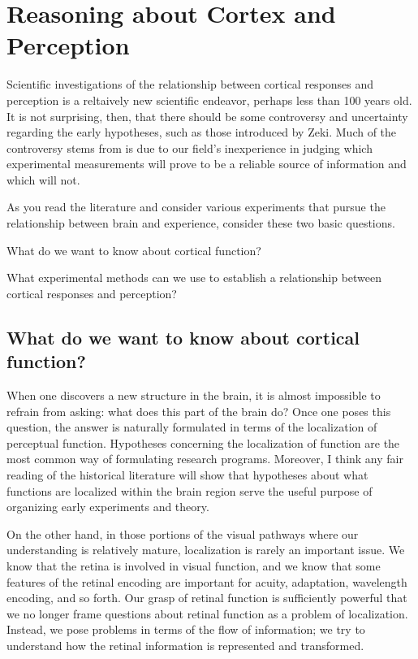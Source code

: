 \section{Reasoning about Cortex and Perception} 
Scientific investigations of the relationship between cortical
responses and perception is a reltaively new scientific endeavor,
perhaps less than 100 years old.  It is not surprising, then, that
there should be some controversy and uncertainty regarding the early
hypotheses, such as those introduced by Zeki.  Much of the controversy
stems from is due to our field's inexperience in judging which
experimental measurements will prove to be a reliable source of
information and which will not.

As you read the literature and consider various experiments that
pursue the relationship between brain and experience, consider these
two basic questions.

\be
\item What do we want to know about cortical function?

\item What experimental methods can we use to establish a relationship
between cortical responses and perception?
\ee

\subsection*{What do we want to know about cortical function?} When
one discovers a new structure in the brain, it is almost impossible
to refrain from asking: what does this part of the brain do?  Once
one poses this question, the answer is naturally formulated in terms
of the localization of perceptual function.  Hypotheses concerning
the localization of function are the most common way of formulating
research programs.  Moreover, I think any fair reading of the
historical literature will show that hypotheses about what functions
are localized within the brain region serve the useful purpose of
organizing early experiments and theory.

On the other hand, in those portions of the visual pathways where our
understanding is relatively mature, localization is rarely an
important issue.  We know that the retina is involved in visual
function, and we know that some features of the retinal encoding are
important for acuity, adaptation, wavelength encoding, and so forth.
Our grasp of retinal function is sufficiently powerful that we no
longer frame questions about retinal function as a problem of
localization.  Instead, we pose problems in terms of the flow of
information; we try to understand how the retinal information is
represented and transformed.

